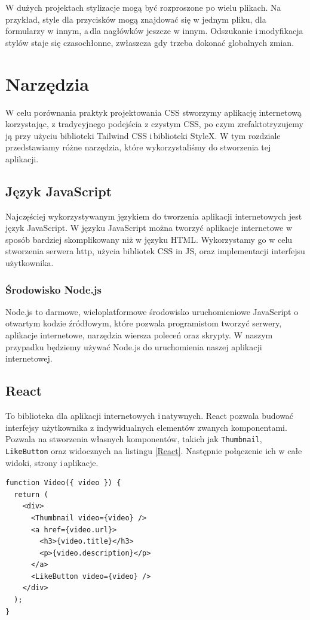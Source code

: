 \documentclass[a4paper,12pt]{book} %
\begin{document}
W dużych projektach stylizacje mogą być rozproszone po wielu plikach. Na przykład, style dla przycisków mogą znajdować się w jednym pliku, dla formularzy w innym, a\,dla nagłówków jeszcze w innym. Odszukanie i\,modyfikacja stylów staje się czasochłonne, zwłaszcza gdy trzeba dokonać globalnych zmian.
\chapter{Narzędzia}
W celu porównania praktyk projektowania CSS stworzymy aplikację internetową korzystając, z tradycyjnego podejścia z czystym CSS, po czym zrefaktotryzujemy ją przy użyciu biblioteki Tailwind CSS i\,biblioteki StyleX. W tym rozdziale przedstawiamy różne narzędzia, które wykorzystaliśmy do stworzenia tej aplikacji.
\section{Język JavaScript}
Najczęściej wykorzystywanym językiem do tworzenia aplikacji internetowych jest język JavaScript. W języku JavaScript można tworzyć aplikacje internetowe w sposób bardziej skomplikowany niż w języku HTML. Wykorzystamy go w celu stworzenia serwera http, użycia bibliotek CSS in JS, oraz implementacji interfejsu użytkownika.
\subsection{Środowisko Node.js}
Node.js to darmowe, wieloplatformowe środowisko uruchomieniowe JavaScript o\,otwartym kodzie źródłowym, które pozwala programistom tworzyć serwery, aplikacje internetowe, narzędzia wiersza poleceń oraz skrypty. W naszym przypadku będziemy używać Node.js do uruchomienia naszej aplikacji internetowej.

\section{React}
To biblioteka dla aplikacji internetowych i\,natywnych. React pozwala budować interfejsy użytkownika z indywidualnych elementów zwanych komponentami. Pozwala na stworzenia własnych komponentów, takich jak \lstinline|Thumbnail|, \lstinline|LikeButton| oraz  widocznych na listingu \ref{React}. Następnie połączenie ich w całe widoki, strony i\,aplikacje.

\begin{lstfloat}[hb]
  \lstset{language=HTML}
  \begin{lstlisting}[frame=single]
function Video({ video }) {
  return (
    <div>
      <Thumbnail video={video} />
      <a href={video.url}>
        <h3>{video.title}</h3>
        <p>{video.description}</p>
      </a>
      <LikeButton video={video} />
    </div>
  );
}
\end{lstlisting}
  \caption{Kod React przedstawiający komponent \lstinline|Video|}\label{React}
\end{lstfloat}
\end{document}

